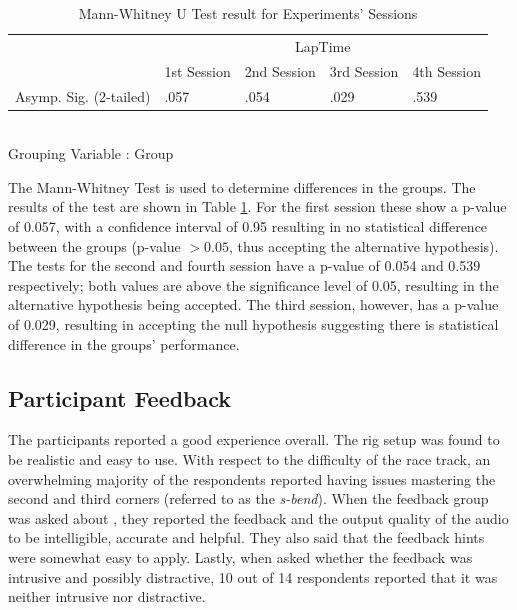 \documentclass{sig-alternate}
\begin{document}
{{\begin{table}
	\centering
	\begin{tabular}{|l|l|l|l|l|}
		\hline
		& \multicolumn{4}{c|}{LapTime}            \\ \cline{2-5} 
		& 1st Session & 2nd Session & 3rd Session & 4th Session \\ \hline
		Asymp. Sig. (2-tailed) & .057 & .054        & .029        & .539        \\ \hline
	\end{tabular}\\
	Grouping Variable : Group
	\caption[Mann-Whitney U Test for Experiments' Sessions]{Mann-Whitney U Test result for Experiments' Sessions}
	\label{table:Mann-Whitney-Sessions}
\end{table}

The Mann-Whitney Test is used to determine differences in the groups. The results of the test are shown in Table \ref{table:Mann-Whitney-Sessions}. For the first session these show a p-value of 0.057, with a confidence interval of 0.95 resulting in no statistical difference between the groups (p-value $> 0.05$, thus accepting the alternative hypothesis).  The tests for the second and fourth session have a p-value of 0.054 and 0.539 respectively; both values are above the significance level of 0.05, resulting in the alternative hypothesis being accepted. The third session, however, has a p-value of 0.029, resulting in accepting the null hypothesis suggesting there is statistical difference in the groups' performance.

\subsection{Participant Feedback}
The participants reported a good experience overall. The rig setup was found to be realistic and easy to use. With respect to the difficulty of the race track, an overwhelming majority of the respondents reported having issues mastering the second and third corners (referred to as the \emph{s-bend}). When the feedback group was asked about \methodname, they reported the feedback and the output quality of the audio to be intelligible, accurate and helpful. They also said that the feedback hints were somewhat easy to apply. Lastly, when asked whether the feedback was intrusive and possibly distractive, 10 out of 14 respondents reported that it was neither intrusive nor distractive.

}}
\end{document}
